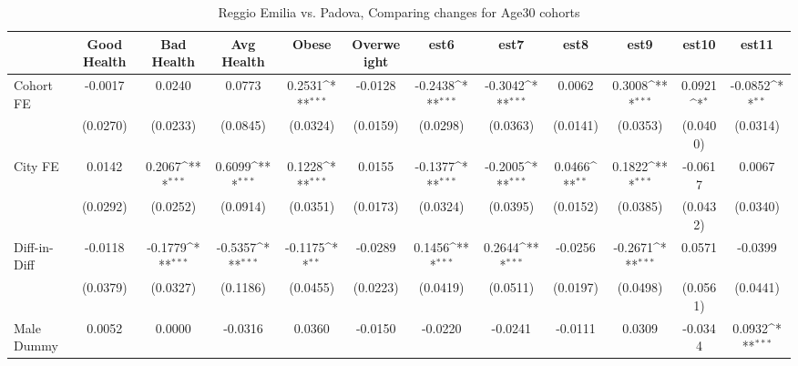 \documentclass{article}
\begin{document}
\begin{table}[htbp]\centering
\def\sym#1{\ifmmode^{#1}\else\(^{#1}\)\fi}
\caption{Reggio Emilia vs. Padova, Comparing changes for Age30 cohorts}
\begin{tabular}{l*{11}{c}}
\toprule
            &\multicolumn{1}{c}{Good Health}&\multicolumn{1}{c}{Bad Health}&\multicolumn{1}{c}{Avg Health}&\multicolumn{1}{c}{Obese}&\multicolumn{1}{c}{Overweight}&\multicolumn{1}{c}{est6}&\multicolumn{1}{c}{est7}&\multicolumn{1}{c}{est8}&\multicolumn{1}{c}{est9}&\multicolumn{1}{c}{est10}&\multicolumn{1}{c}{est11}\\
\midrule
Cohort FE   &     -0.0017         &      0.0240         &      0.0773         &      0.2531\sym{***}&     -0.0128         &     -0.2438\sym{***}&     -0.3042\sym{***}&      0.0062         &      0.3008\sym{***}&      0.0921\sym{*}  &     -0.0852\sym{**} \\
            &    (0.0270)         &    (0.0233)         &    (0.0845)         &    (0.0324)         &    (0.0159)         &    (0.0298)         &    (0.0363)         &    (0.0141)         &    (0.0353)         &    (0.0400)         &    (0.0314)         \\
\addlinespace
City FE     &      0.0142         &      0.2067\sym{***}&      0.6099\sym{***}&      0.1228\sym{***}&      0.0155         &     -0.1377\sym{***}&     -0.2005\sym{***}&      0.0466\sym{**} &      0.1822\sym{***}&     -0.0617         &      0.0067         \\
            &    (0.0292)         &    (0.0252)         &    (0.0914)         &    (0.0351)         &    (0.0173)         &    (0.0324)         &    (0.0395)         &    (0.0152)         &    (0.0385)         &    (0.0432)         &    (0.0340)         \\
\addlinespace
Diff-in-Diff&     -0.0118         &     -0.1779\sym{***}&     -0.5357\sym{***}&     -0.1175\sym{**} &     -0.0289         &      0.1456\sym{***}&      0.2644\sym{***}&     -0.0256         &     -0.2671\sym{***}&      0.0571         &     -0.0399         \\
            &    (0.0379)         &    (0.0327)         &    (0.1186)         &    (0.0455)         &    (0.0223)         &    (0.0419)         &    (0.0511)         &    (0.0197)         &    (0.0498)         &    (0.0561)         &    (0.0441)         \\
\addlinespace
Male Dummy  &      0.0052         &      0.0000         &     -0.0316         &      0.0360         &     -0.0150         &     -0.0220         &     -0.0241         &     -0.0111         &      0.0309         &     -0.0344         &      0.0932\sym{***}\\

\end{tabular}
\end{table}
\end{document}
